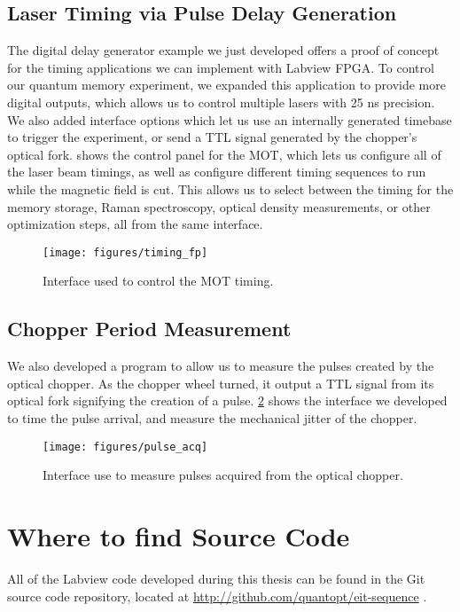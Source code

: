 




\subsection{Laser Timing via Pulse Delay Generation} 

The digital delay generator example we just developed offers a proof of concept for the timing applications we can implement with Labview FPGA.  To control our quantum memory experiment, we expanded this application to provide more digital outputs, which allows us to control multiple lasers with 25 ns precision.  We also added interface options which let us use an internally generated timebase to trigger the experiment, or send a TTL signal generated by the chopper's optical fork.   shows the control panel for the MOT, which lets us configure all of the laser beam timings, as well as configure different timing sequences to run while the magnetic field is cut.  This allows us to select between the timing for the memory storage, Raman spectroscopy, optical density measurements, or other optimization steps, all from the same interface.

 \begin{figure}[!ht] 
  \centering 
  \texttt{[image: figures/timing\_fp]} 
  \caption[MOT timing interface]{Interface used to control the MOT timing.} 
  \label{fig:timing_fp} 
 \end{figure}


\subsection{Chopper Period Measurement} 

We also developed a program to allow us to measure the pulses created by the optical chopper.  As the chopper wheel turned, it output a TTL signal from its optical fork signifying the creation of a pulse.  \ref{fig:pulse_acq} shows the interface we developed to time the pulse arrival, and measure the mechanical jitter of the chopper.

\begin{figure}[!ht] 
 \centering 
 \texttt{[image: figures/pulse\_acq]} 
 \caption[Chopper pulse acquisition]{Interface use to measure pulses acquired from the optical chopper.} 
 \label{fig:pulse_acq} 
\end{figure}


\section{Where to find Source Code}

All of the Labview code developed during this thesis can be found in the Git source code repository, located at \href{http://github.com/quantopt/eit-sequence/zipball/master}{http://github.com/quantopt/eit-sequence} \cite{quantopt}.
